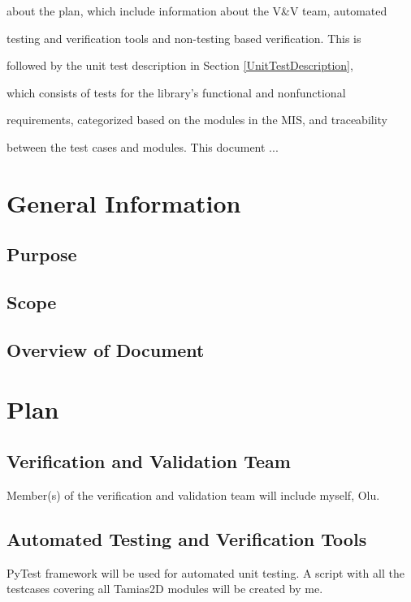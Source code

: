 \documentclass[12pt, titlepage]{article}
\newcommand{\progname}{Tamias2D}
\begin{document}
about the plan, which include information about the V\&V team, automated 

testing and verification tools and non-testing based verification. This is 

followed by the unit test description in Section \ref{UnitTestDescription}, 

which consists of tests for the library's functional and nonfunctional 

requirements, categorized based on the modules in the MIS, and traceability 

between the test cases and modules.
This document ... 

\section{General Information}

\subsection{Purpose}

\subsection{Scope}

\subsection{Overview of Document}

\section{Plan}
	
\subsection{Verification and Validation Team}

Member(s) of the verification and validation team will include myself, Olu.

\subsection{Automated Testing and Verification Tools}
PyTest framework will be used for automated unit
testing. A script with all the testcases covering all \progname{} modules  will be created by me. 
\end{document}
